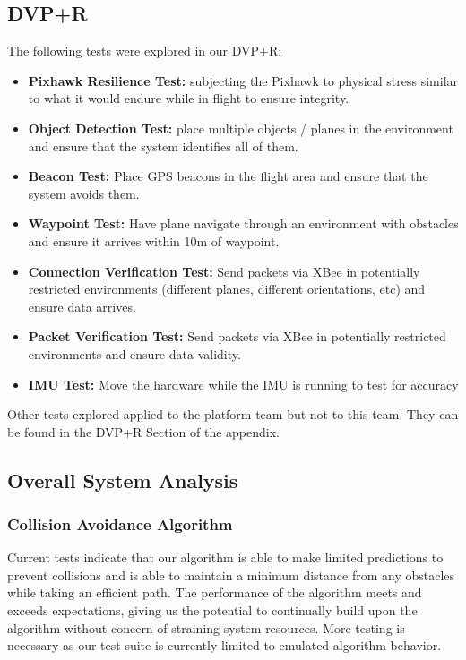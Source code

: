 \documentclass[12pt]{article}
\begin{document}
\subsection{DVP+R}
The following tests were explored in our DVP+R:
\begin{itemize}
\item \textbf{Pixhawk Resilience Test:} subjecting the Pixhawk to physical stress similar to what it would endure while in flight to ensure integrity.
\item \textbf{Object Detection Test:} place multiple objects / planes in the environment and ensure that the system identifies all of them.
\item \textbf{Beacon Test:} Place GPS beacons in the flight area and ensure that the system avoids them.
\item \textbf{Waypoint Test:} Have plane navigate through an environment with obstacles and ensure it arrives within 10m of waypoint.
\item \textbf{Connection Verification Test:} Send packets via XBee in potentially restricted environments (different planes, different orientations, etc) and ensure data arrives.
\item \textbf{Packet Verification Test:} Send packets via XBee in potentially restricted environments and ensure data validity.
\item \textbf{IMU Test:} Move the hardware while the IMU is running to test for accuracy
\end{itemize}

Other tests explored applied to the platform team but not to this team. They can be found in the DVP+R Section of the appendix.

\subsection{Overall System Analysis}
\subsubsection{Collision Avoidance Algorithm}
Current tests indicate that our algorithm is able to make limited predictions to prevent collisions and is able to maintain a minimum distance from any obstacles while taking an efficient path. The performance of the algorithm meets and exceeds expectations, giving us the potential to continually build upon the algorithm without concern of straining system resources. More testing is necessary as our test suite is currently limited to emulated algorithm behavior.
\end{document}
